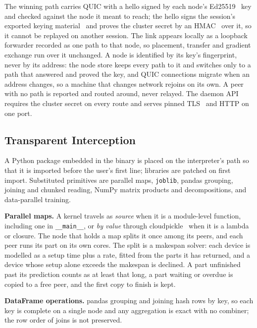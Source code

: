 \documentclass[conference]{IEEEtran}
\begin{document}
The winning path carries QUIC with a hello signed by each node's
Ed25519~\cite{bernstein2012ed25519} key and checked against the node it meant to
reach; the hello signs the session's exported keying material~\cite{rfc5705} and
proves the cluster secret by an HMAC~\cite{rfc2104} over it, so it cannot be
replayed on another session. The link appears locally as a loopback forwarder
recorded as one path to that node, so placement, transfer and gradient exchange
run over it unchanged. A node is identified by its key's fingerprint, never by
its address: the node store keeps every path to it and switches only to a path
that answered and proved the key, and QUIC connections migrate when an address
changes, so a machine that changes network rejoins on its own. A peer with no
path is reported and routed around, never relayed. The daemon API requires the
cluster secret on every route and serves pinned TLS~\cite{rfc8446} and HTTP on
one port.

\subsection{Transparent Interception}
\label{sec:intercept}

A Python package embedded in the binary is placed on the interpreter's path so
that it is imported before the user's first line; libraries are patched on first
import. Substituted primitives are parallel maps, \texttt{joblib}, pandas
grouping, joining and chunked reading, NumPy matrix products and
decompositions, and data-parallel training.

\textbf{Parallel maps.} A kernel travels as \emph{source} when it is a
module-level function, including one in \texttt{\_\_main\_\_}, or \emph{by
value} through cloudpickle~\cite{cloudpickle} when it is a lambda or closure.
The node that holds a map splits it once among its peers, and each peer runs
its part on its own cores. The split is a makespan solver: each device is modelled
as a setup time plus a rate, fitted from the parts it has returned, and a
device whose setup alone exceeds the makespan is declined. A part unfinished
past its prediction counts as at least that long, a part waiting or
overdue is copied to a free peer, and the first copy to finish is kept.

\textbf{DataFrame operations.} pandas grouping and joining hash rows by key, so each key is
complete on a single node and any aggregation is exact with no combiner; the row
order of joins is not preserved.
\end{document}
